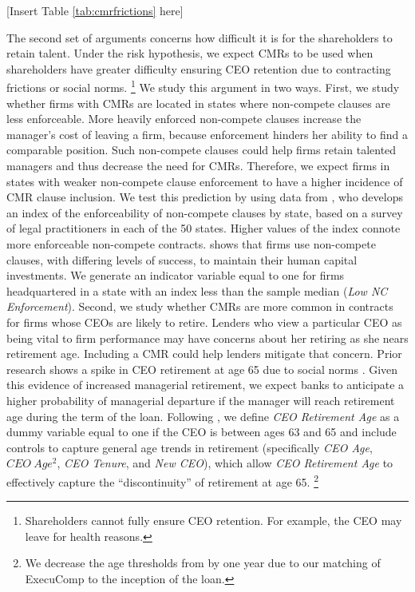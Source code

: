 \documentclass[a4paper,12pt]{article}
\begin{document}
\begin{center}
  [Insert Table \ref{tab:cmrfrictions} here]
\end{center}




The second set of arguments concerns how difficult it is for the shareholders to retain talent.
Under the risk hypothesis, we expect CMRs to be used when shareholders have greater difficulty ensuring CEO retention due to contracting frictions or social norms.%
	\footnote{Shareholders cannot fully ensure CEO retention. For example, the CEO may leave for health reasons.}
We study this argument in two ways.
First, we study whether firms with CMRs are located in states where non-compete clauses are less enforceable. 
More heavily enforced non-compete clauses increase the manager's cost of leaving a firm, because enforcement hinders her ability to find a comparable position.
Such non-compete clauses could help firms retain talented managers and thus decrease the need for CMRs.
Therefore, we expect firms in states with weaker non-compete clause enforcement to have a higher incidence of CMR clause inclusion.
We test this prediction by using data from \cite{Garmaise_2011}, who develops an index of the enforceability of non-compete clauses by state, based on a survey of legal practitioners in each of the 50 states.
Higher values of the index connote more enforceable non-compete contracts. 
\cite{Garmaise_2011} shows that firms use non-compete clauses, with differing levels of success, to maintain their human capital investments.
We generate an indicator variable equal to one for firms headquartered in a state with an index less than the sample median (\textit{Low NC Enforcement}).
Second, we study whether CMRs are more common in contracts for firms whose CEOs are likely to retire.
Lenders who view a particular CEO as being vital to firm performance may have concerns about her retiring as she nears retirement age.
Including a CMR could help lenders mitigate that concern.
Prior research shows a spike in CEO retirement at age 65 due to social norms \citep{Jenter_2015a}.
Given this evidence of increased managerial retirement, we expect banks to anticipate a higher probability of managerial departure if the manager will reach retirement age during the term of the loan.
Following \cite{Jenter_2015a}, we define \textit{CEO Retirement Age} as a dummy variable equal to one if the CEO is between ages 63 and 65
and include controls to capture general age trends in retirement (specifically \textit{CEO Age}, $CEO\ Age^2$, \textit{CEO Tenure}, and \textit{New CEO}), which allow \textit{CEO Retirement Age} to effectively capture the ``discontinuity'' of retirement at age 65.%
    \footnote{We decrease the age thresholds from \cite{Jenter_2015a} by one year due to our matching of ExecuComp to the inception of the loan.}
\end{document}
